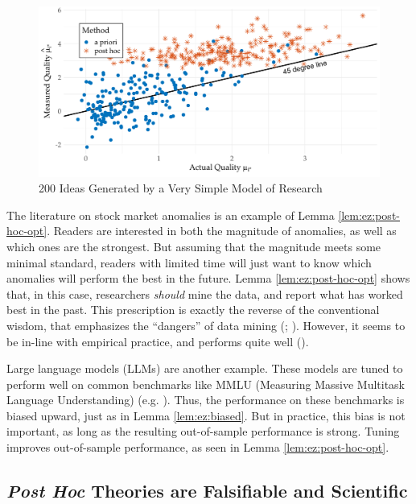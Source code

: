 \documentclass[12pt,english]{article}
\theoremstyle{plain}
\theoremstyle{plain}
\begin{document}
\begin{figure}[htbp]
    \centering
    \includegraphics[width=\textwidth]{exhibits/simple-scatter.pdf}
    \caption{200 Ideas Generated by a Very Simple Model of Research}
    \label{fig:ez}
\end{figure}


The literature on stock market anomalies is an example of Lemma \ref{lem:ez:post-hoc-opt}. Readers are interested in both the magnitude of anomalies, as well as which ones are the strongest.  But assuming that the magnitude meets some minimal standard, readers with limited time will just want to know which anomalies will perform the best in the future. Lemma \ref{lem:ez:post-hoc-opt} shows that, in this case, researchers \emph{should} mine the data, and report what has worked best in the past. This prescription is exactly the reverse of the conventional wisdom, that emphasizes the ``dangers'' of data mining (\citealt{sullivan1999data}; \citealt{harvey2016and}). However, it seems to be in-line with empirical practice, and performs quite well (\citealt{chen2024does}).

Large language models (LLMs) are another example. These models are tuned to perform well on common benchmarks like MMLU (Measuring Massive Multitask Language Understanding) (e.g. \citet{guo2025deepseek}). Thus, the performance on these benchmarks is biased upward, just as in Lemma \ref{lem:ez:biased}. But in practice, this bias is not important, as long as the resulting out-of-sample performance is strong. Tuning improves out-of-sample performance, as seen in Lemma \ref{lem:ez:post-hoc-opt}. 


\subsection{\emph{Post Hoc} Theories are Falsifiable and Scientific}
\end{document}
